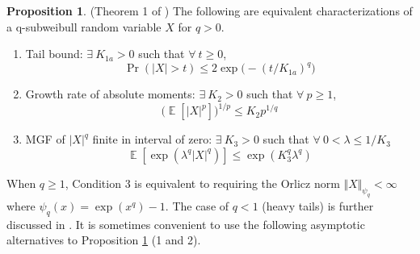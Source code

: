 \documentclass{article}
\theoremstyle{definition}
\newtheorem{proposition}{Proposition}[section]
\DeclareMathOperator{\E}{\mathbb{E}}
\begin{document}
\begin{proposition}(Theorem 1 of \cite{vladimirovaSubWeibullDistributionsGeneralizing2020})
\label{prop:subweibull}
The following are equivalent characterizations of a q-subweibull random variable $X$ for $q>0$. %
\begin{enumerate}
  \item Tail bound: $\exists~K_{1a}>0$ such that $\forall~t\geq 0$, 
  \[\Pr(\vert X\vert > t) \leq 2\exp\big(-(t/K_{1a})^q\big)\] %
  \item Growth rate of absolute moments: $\exists~K_2>0$ such that $\forall~p\geq 1$, 
  \[\big(\E[\vert X\vert^p]\big)^{1/p}\leq K_2 p^{1/q}\] %
  \item MGF of $\vert X\vert^q$ finite in interval of zero: $\exists~K_3>0$ such that $\forall~0<\lambda\leq 1/K_3$
    \[\E\left[\exp(\lambda^q \vert X\vert^q)\right]\leq \exp(K_3^q \lambda^q)\]
\end{enumerate}
\end{proposition}
When $q\geq 1$, Condition 3 is equivalent to requiring the Orlicz norm $\Vert X \Vert_{\psi_q}<\infty$ where $\psi_q(x)=\exp(x^q)-1$. The case of $q<1$ (heavy tails) is further discussed in \cite{kuchibhotlaMovingSubGaussianityHighdimensional2022}. 
It is sometimes convenient to use the following asymptotic alternatives to Proposition \ref{prop:subweibull} (1 and 2).
\end{document}

